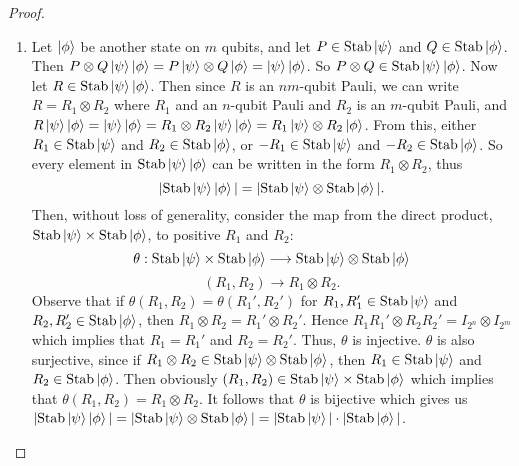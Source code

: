 \documentclass[12pt]{dalthesis}
\begin{document}
\begin{proof}
\begin{enumerate}
\item Let $\ket{\phi}$ be another state on $m$ qubits, and let $P \in \text{Stab}\ket{\psi}$ and $Q \in \text{Stab}\ket{\phi}$. Then $P \otimes Q \ket{\psi}\ket{\phi} = P\ket{\psi} \otimes Q\ket{\phi} = \ket{\psi}\ket{\phi}$. So $P \otimes Q \in \text{Stab}\ket{\psi}\ket{\phi}$. Now let $R \in \text{Stab}\ket{\psi}\ket{\phi}$. Then since $R$ is an $nm$-qubit Pauli, we can write $R = R_1 \otimes R_2$ where $R_1$ and an $n$-qubit Pauli and $R_2$ is an $m$-qubit Pauli, and $R\ket{\psi}\ket{\phi} = \ket{\psi}\ket{\phi} = R_1 \otimes R_2 \ket{\psi}\ket{\phi} = R_1\ket{\psi} \otimes R_2\ket{\phi}$. From this, either $R_1 \in \mathrm{Stab} \ket{\psi}$ and $R_2 \in \mathrm{Stab} \ket{\phi}$, or $-R_1 \in \mathrm{Stab} \ket{\psi}$ and $-R_2 \in \mathrm{Stab} \ket{\phi}$. So every element in $\text{Stab}\ket{\psi}\ket{\phi}$ can be written in the form $R_1 \otimes R_2$, thus 
\[
 |\text{Stab}\ket{\psi}\ket{\phi}| = |\text{Stab}\ket{\psi} \otimes \text{Stab}\ket{\phi}|.
\]
Then, without loss of generality, consider the map from the direct product, $\mathrm{Stab} \ket{\psi} \times \mathrm{Stab} \ket{\phi}$, to positive $R_1$ and $R_2$:
\[
\theta:\text{Stab}\ket{\psi} \times \text{Stab}\ket{\phi} \longrightarrow  \text{Stab}\ket{\psi} \otimes \text{Stab}\ket{\phi}
\]
\[
(R_1, R_2) \longrightarrow R_1 \otimes R_2.
\]
Observe that if $\theta (R_1, R_2) = \theta (R_1', R_2')$ for $R_1, R_1' \in \mathrm{Stab} \ket{\psi}$ and $R_2, R_2' \in \mathrm{Stab} \ket{\phi}$, then $R_1 \otimes R_2 = R_1' \otimes R_2'$. Hence $R_1R_1' \otimes R_2R_2' = I_{2^n} \otimes I_{2^m}$ which implies that $R_1 = R_1'$ and $R_2 = R_2'$. Thus, $\theta$ is injective. $\theta$ is also surjective, since if $R_1 \otimes R_2 \in \mathrm{Stab} \ket{\psi} \otimes \mathrm{Stab} \ket{\phi}$, then $R_1 \in \mathrm{Stab} \ket{\psi}$ and $R_2 \in \mathrm{Stab} \ket{\phi}$. Then obviously $(R_1, R_2) \in \mathrm{Stab} \ket{\psi} \times \mathrm{Stab} \ket{\phi}$ which implies that $\theta (R_1, R_2) = R_1 \otimes R_2$. It follows that $\theta$ is bijective which gives us $|\text{Stab}\ket{\psi}\ket{\phi}| = |\text{Stab}\ket{\psi} \otimes \text{Stab}\ket{\phi}| = |\text{Stab}\ket{\psi}| \cdot |\text{Stab}\ket{\phi}|$.
 \qedhere
\end{enumerate}
\end{proof}
\end{document}
